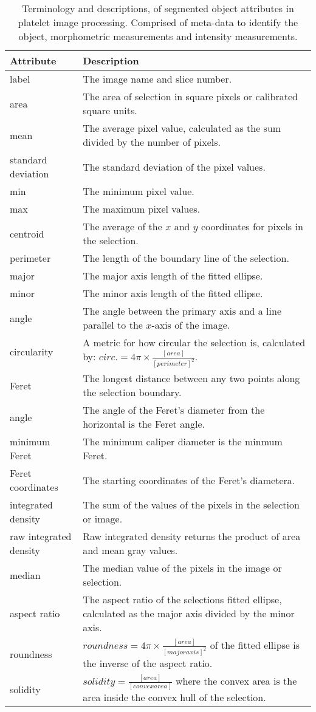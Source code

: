 \begin{table}[htbp]
\caption[Platelets segmented region attributes and properties]{Terminology and descriptions, of segmented object attributes in platelet image processing. Comprised of meta-data to identify the object, morphometric measurements and intensity measurements.}
\centering
\label{table:platelets:region_properties}
\begin{tabular}{p{4cm} p{10cm}}
	\toprule
	Attribute  & Description \\
	\midrule
	label & The image name and slice number.\\
	area & The area of selection in square pixels or calibrated square units.\\
	mean & The average pixel value, calculated as the sum divided by the number of pixels. \\
	standard deviation & The standard deviation of the pixel values. \\
	min & The minimum pixel value. \\
	max & The maximum pixel values. \\
	centroid & The average of the $x$ and $y$ coordinates for pixels in the selection. \\
	perimeter & The length of the boundary line of the selection. \\
	major & The major axis length of the fitted ellipse. \\
	minor & The minor axis length of the fitted ellipse. \\
	angle & The angle between the primary axis and a line parallel to the $x$-axis of the image. \\
	circularity & A metric for how circular the selection is, calculated by: $circ.=4\pi \times \frac{[area]}{[perimeter]^2}$. \\
	Feret & The longest distance between any two points along the selection boundary. \\
	angle & The angle of the Feret's diameter from the horizontal is the Feret angle. \\
	minimum Feret & The minimum caliper diameter is the minmum Feret. \\
	Feret coordinates & The starting coordinates of the Feret's diametera. \\
	integrated density & The sum of the values of the pixels in the selection or image. \\
	raw integrated density & Raw integrated density returns the product of area and mean gray values. \\
	median & The median value of the pixels in the image or selection. \\
	aspect ratio & The aspect ratio of the selections fitted ellipse, calculated as the major axis divided by the minor axis. \\
	roundness & $roundness=4\pi \times \frac{[area]}{[major axis]^2}$ of the fitted ellipse is the inverse of the aspect ratio. \\
	solidity & $solidity=\frac{[area]}{[convex area]}$ where the convex area is the area inside the convex hull of the selection. \\
	\bottomrule
\end{tabular}
\end{table}

